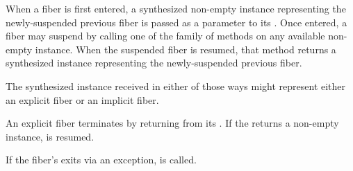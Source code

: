 When a fiber is first entered, a synthesized non-empty \fiber instance
representing the newly-suspended previous fiber is passed as a parameter to
its \entryfn. Once entered, a fiber may suspend by calling one of the \resume
family of methods on any available non-empty \fiber instance. When the
suspended fiber is resumed, that method returns a synthesized \fiber instance
representing the newly-suspended previous fiber.

The synthesized \fiber instance received in either of those ways might
represent either an explicit fiber or an implicit fiber.

An explicit fiber terminates by returning from its \entryfn. If the \entryfn
returns a non-empty \fiber instance,  is resumed.



If the fiber's \entryfn exits via an exception,  is called.



